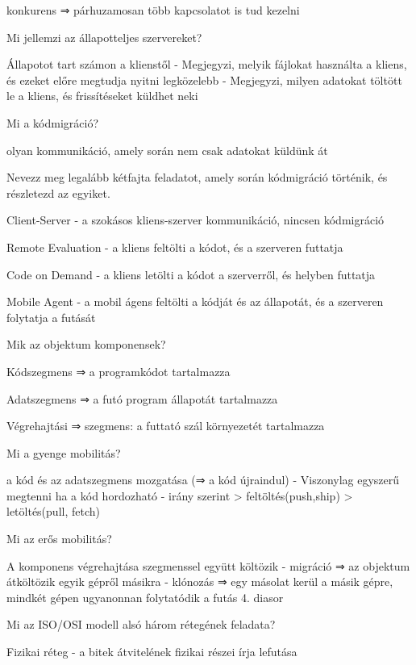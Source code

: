 \documentclass[12pt]{article}
\begin{document}
\begin{description}
    \item konkurens ⇒ párhuzamosan több kapcsolatot is tud kezelni
    \item  Mi jellemzi az állapotteljes szervereket?
    \item Állapotot tart számon a klienstől
        - Megjegyzi, melyik fájlokat használta a kliens, és ezeket előre megtudja nyitni legközelebb
        - Megjegyzi, milyen adatokat töltött le a kliens, és frissítéseket küldhet neki
    \item  Mi a kódmigráció?
    \item olyan kommunikáció, amely során nem csak adatokat küldünk át
    \item  Nevezz meg legalább kétfajta feladatot, amely során kódmigráció történik, és részletezd az egyiket.
    \item Client-Server
        - a szokásos kliens-szerver kommunikáció, nincsen kódmigráció
    \item Remote Evaluation 
        - a kliens feltölti a kódot, és a szerveren futtatja
    \item Code on Demand 
        - a kliens letölti a kódot a szerverről, és helyben futtatja
    \item Mobile Agent 
        - a mobil ágens feltölti a kódját és az állapotát, és a szerveren folytatja a futását
    \item  Mik az objektum komponensek?
    \item Kódszegmens  ⇒ a programkódot tartalmazza
    \item Adatszegmens ⇒ a futó program állapotát tartalmazza
    \item Végrehajtási ⇒ szegmens: a futtató szál környezetét tartalmazza
    \item  Mi a gyenge mobilitás?
    \item a kód és az adatszegmens mozgatása (⇒ a kód újraindul)
        - Viszonylag egyszerű megtenni ha a kód hordozható
        - irány szerint
        > feltöltés(push,ship)
        > letöltés(pull, fetch)
    \item  Mi az erős mobilitás?
    \item A komponens végrehajtása szegmenssel együtt költözik
        - migráció ⇒ az objektum átköltözik egyik gépről másikra
        - klónozás ⇒ egy másolat kerül a másik gépre, mindkét gépen ugyanonnan folytatódik a futás
        4. diasor
    \item  Mi az ISO/OSI modell alsó három rétegének feladata?
    \item Fizikai réteg
        - a bitek átvitelének fizikai részei írja lefutása

\end{description}
\end{document}
